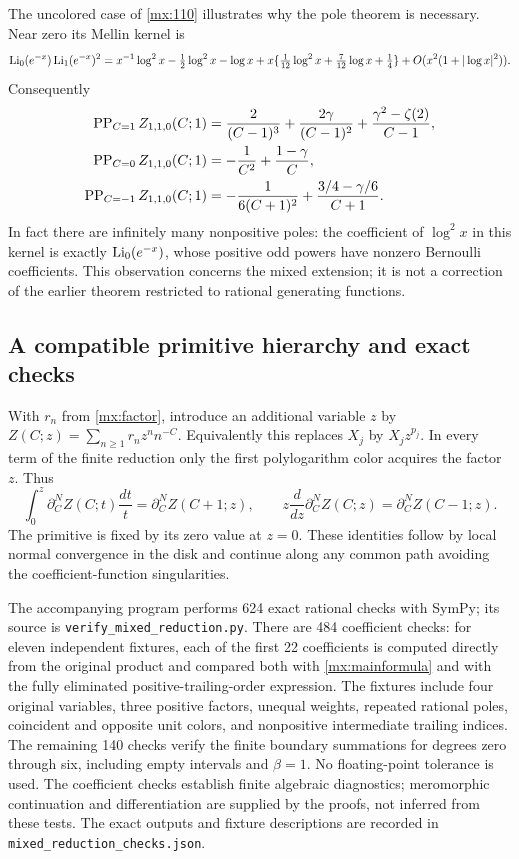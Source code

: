\documentclass[11pt]{article}
\numberwithin{equation}{section}
\theoremstyle{definition}
\theoremstyle{remark}
\begin{document}
The uncolored case of \eqref{mx:110} illustrates why the pole theorem
is necessary.  Near zero its Mellin kernel is
\[
 \operatorname{Li}_0(e^{-x})\operatorname{Li}_1(e^{-x})^2
 =x^{-1}\log^2x-\tfrac12\log^2x-\log x
   +x\{\tfrac1{12}\log^2x+\tfrac7{12}\log x+\tfrac14\}
   +O(x^2(1+|\log x|^2)).
\]
Consequently
\begin{align}\label{mx:examplepoles}
 \operatorname{PP}_{C=1} Z_{1,1,0}(C;1)
  &=\frac2{(C-1)^3}+\frac{2\gamma}{(C-1)^2}
                         +\frac{\gamma^2-\zeta(2)}{C-1},\notag\\
 \operatorname{PP}_{C=0} Z_{1,1,0}(C;1)
  &=-\frac1{C^2}+\frac{1-\gamma}{C},\notag\\
 \operatorname{PP}_{C=-1} Z_{1,1,0}(C;1)
  &=-\frac1{6(C+1)^2}+\frac{3/4-\gamma/6}{C+1}.
\end{align}
In fact there are infinitely many nonpositive poles: the coefficient
of $\log^2x$ in this kernel is exactly
$\operatorname{Li}_0(e^{-x})$, whose positive odd powers have nonzero Bernoulli
coefficients.  This observation concerns the mixed extension; it is
not a correction of the earlier theorem restricted to rational
generating functions.

\subsection{A compatible primitive hierarchy and exact checks}

With $r_n$ from \eqref{mx:factor}, introduce an additional variable
$z$ by $Z(C;z)=\sum_{n\geq1}r_nz^nn^{-C}$.  Equivalently this
replaces $X_j$ by $X_jz^{p_j}$.  In every term of the finite reduction
only the first polylogarithm color acquires the factor $z$.  Thus
\begin{equation}\label{mx:primitives}
 \int_0^z\partial_C^N Z(C;t)\frac{dt}{t}
        =\partial_C^N Z(C+1;z),\qquad
 z\frac d{dz}\partial_C^N Z(C;z)
        =\partial_C^N Z(C-1;z).
\end{equation}
The primitive is fixed by its zero value at $z=0$.  These identities
follow by local normal convergence in the disk and continue along
any common path avoiding the coefficient-function singularities.

The accompanying program performs 624 exact rational checks with
SymPy; its source is \texttt{verify\_mixed\_reduction.py}.
There are 484 coefficient
checks: for eleven independent fixtures, each of the first 22
coefficients is computed directly from the original product and
compared both with \eqref{mx:mainformula} and with the fully eliminated
positive-trailing-order expression.  The fixtures include four
original variables, three positive factors, unequal weights, repeated
rational poles, coincident and opposite unit colors, and nonpositive
intermediate trailing indices.  The remaining 140 checks verify the
finite boundary summations for degrees zero through six, including
empty intervals and $\beta=1$.  No floating-point tolerance is used.
The coefficient checks establish finite algebraic diagnostics;
meromorphic continuation and differentiation are supplied by the
proofs, not inferred from these tests.  The exact outputs and fixture
descriptions are recorded in \texttt{mixed\_reduction\_checks.json}.
\end{document}
